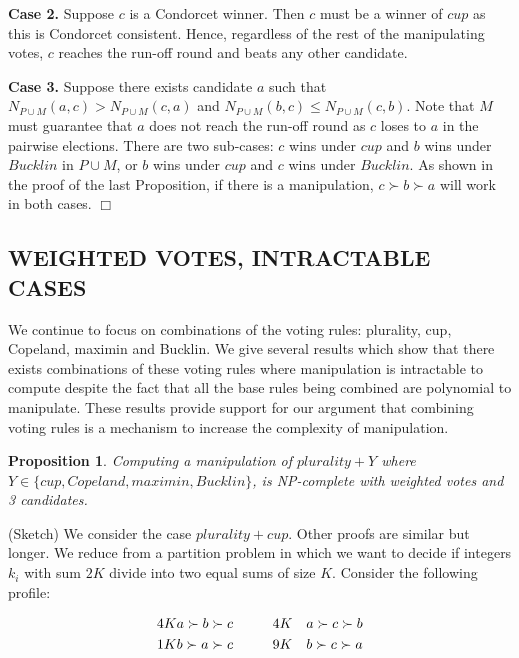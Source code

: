 \documentclass{ecai2012}
\newcommand{\winner}[2]{\mbox{$#1 + #2$}}
\newtheorem{proposition}{Proposition}
\newcommand{\myproof}{\vspace{-3mm}\noindent {\bf Proof:\ \ }}
\newcommand{\myqed}{\mbox{$\Box$}}
\begin{document}
{\bf Case 2.}
Suppose $c$ is a Condorcet winner.
Then $c$ must be a winner of $cup$ as this is
Condorcet consistent. Hence, regardless
of the rest of the manipulating
votes, $c$ reaches the run-off round
and beats any other candidate.

{\bf Case 3.} Suppose there exists
candidate $a$ such that
$N_{P \cup M}(a,c) > N_{P \cup M}(c,a)$ and
$N_{P \cup M}(b,c) \leq N_{P \cup M}(c,b)$.
Note that $M$ must guarantee that
$a$ does not reach the run-off round as
$c$ loses to $a$ in the pairwise elections.
There are two sub-cases: $c$ wins under $cup$
and $b$ wins  under $Bucklin$ in $P\cup M$,
or $b$ wins under $cup$
and $c$ wins  under $Bucklin$.
As shown in the proof of the last Proposition,
if there is a manipulation, $c\succ b \succ a$ will work
in both cases.
\myqed

\vspace{-1mm}
\subsection*{WEIGHTED VOTES, INTRACTABLE CASES}
\vspace{-1mm}
We continue to focus on combinations of the voting rules:
plurality, cup, Copeland, maximin and Bucklin.
We give several results which show that
there exists combinations of these voting rules where
manipulation is intractable to compute %
despite the fact that all the base rules being
combined are polynomial to
manipulate. %
These results provide support
for our argument that combining voting rules is a
mechanism to increase the %
complexity
of manipulation.

\vspace{-3mm}
\begin{proposition}
Computing a manipulation of $\winner{plurality}{Y}$ where
$Y \in \{cup, Copeland, maximin, Bucklin\}$,
is NP-complete with weighted votes and 3 candidates.
\end{proposition}
\myproof (Sketch)
We consider the case $\winner{plurality}{cup}$. Other proofs are
similar but longer.
We reduce from a  {\sc  partition} problem in which we
want to decide if integers $k_i$ with sum
$2K$ divide into two equal sums of size $K$.
Consider the following profile:

\vspace{-5mm}\begin{align*}
4K&a \succ b \succ c \hspace{10mm}
4K&a \succ c \succ b \\
1K&b \succ a \succ c \hspace{10mm}
9K&b \succ c \succ a
\end{align*}
\end{document}
